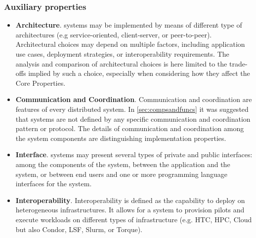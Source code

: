 \documentclass{sig-alternate}
\begin{document}
\subsubsection{Auxiliary properties}
\label{sec:auxprops}

\begin{itemize}

\item \textbf{Architecture}. \pilot systems may be implemented by means of
  different type of architectures (e.g service-oriented, client-server, or
  peer-to-peer). Architectural choices may depend on multiple factors,
  including application use cases, deployment strategies, or interoperability
  requirements.  The analysis and comparison of architectural choices is here
  limited to the trade-offs implied by such a choice, especially when
  considering how they affect the Core Properties.

\item \textbf{Communication and Coordination}. Communication and coordination
  are features of every distributed system. In \ref{sec:compsandfuncs} it was
  suggested that \pilot systems are not defined by any specific communication
  and coordination pattern or protocol. The details of communication and
  coordination among the \pilot system components are distinguishing
  implementation properties.


\item \textbf{Interface}. \pilot systems may present several types of private
  and public interfaces: among the components of the \pilot system, between the
  application and the \pilot system, or between end users and one or more
  programming language interfaces for the \pilot system.

\item \textbf{Interoperability}. Interoperability is defined as the capability
  to deploy \pilots on heterogeneous infrastructures. It allows for a \pilot
  system to provision pilots and execute workloads on different types of
  infrastructure (e.g. HTC, HPC, Cloud but also Condor, LSF, Slurm, or Torque).


\end{itemize}
\end{document}
